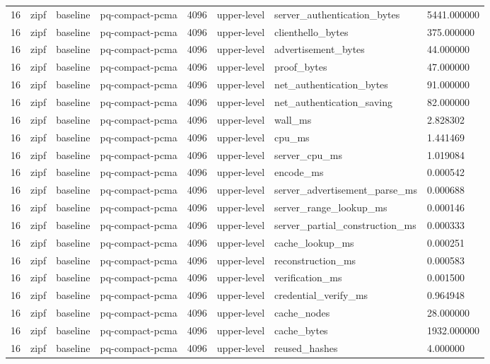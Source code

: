 \begin{tabular}{llllllll}
16 & zipf & baseline & pq-compact-pcma & 4096 & upper-level & server\_authentication\_bytes & 5441.000000 \\
16 & zipf & baseline & pq-compact-pcma & 4096 & upper-level & clienthello\_bytes & 375.000000 \\
16 & zipf & baseline & pq-compact-pcma & 4096 & upper-level & advertisement\_bytes & 44.000000 \\
16 & zipf & baseline & pq-compact-pcma & 4096 & upper-level & proof\_bytes & 47.000000 \\
16 & zipf & baseline & pq-compact-pcma & 4096 & upper-level & net\_authentication\_bytes & 91.000000 \\
16 & zipf & baseline & pq-compact-pcma & 4096 & upper-level & net\_authentication\_saving & 82.000000 \\
16 & zipf & baseline & pq-compact-pcma & 4096 & upper-level & wall\_ms & 2.828302 \\
16 & zipf & baseline & pq-compact-pcma & 4096 & upper-level & cpu\_ms & 1.441469 \\
16 & zipf & baseline & pq-compact-pcma & 4096 & upper-level & server\_cpu\_ms & 1.019084 \\
16 & zipf & baseline & pq-compact-pcma & 4096 & upper-level & encode\_ms & 0.000542 \\
16 & zipf & baseline & pq-compact-pcma & 4096 & upper-level & server\_advertisement\_parse\_ms & 0.000688 \\
16 & zipf & baseline & pq-compact-pcma & 4096 & upper-level & server\_range\_lookup\_ms & 0.000146 \\
16 & zipf & baseline & pq-compact-pcma & 4096 & upper-level & server\_partial\_construction\_ms & 0.000333 \\
16 & zipf & baseline & pq-compact-pcma & 4096 & upper-level & cache\_lookup\_ms & 0.000251 \\
16 & zipf & baseline & pq-compact-pcma & 4096 & upper-level & reconstruction\_ms & 0.000583 \\
16 & zipf & baseline & pq-compact-pcma & 4096 & upper-level & verification\_ms & 0.001500 \\
16 & zipf & baseline & pq-compact-pcma & 4096 & upper-level & credential\_verify\_ms & 0.964948 \\
16 & zipf & baseline & pq-compact-pcma & 4096 & upper-level & cache\_nodes & 28.000000 \\
16 & zipf & baseline & pq-compact-pcma & 4096 & upper-level & cache\_bytes & 1932.000000 \\
16 & zipf & baseline & pq-compact-pcma & 4096 & upper-level & reused\_hashes & 4.000000 \\

\end{tabular}
